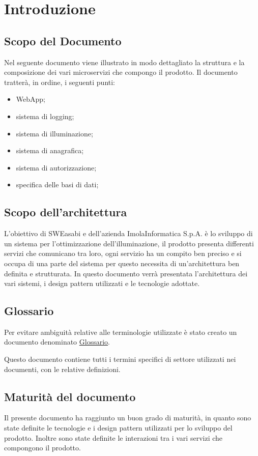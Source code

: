 \chapter{Introduzione}

\section{Scopo del Documento}
Nel seguente documento viene illustrato in modo dettagliato la struttura e la composizione dei vari microservizi che compongo il prodotto. Il documento tratterà, in ordine, i seguenti punti:
\begin{itemize}
    \item WebApp;
    \item sistema di logging;
    \item sistema di illuminazione;
    \item sistema di anagrafica;
    \item sistema di autorizzazione;
    \item specifica delle basi di dati;
\end{itemize}

\section{Scopo dell'architettura}
L'obiettivo di SWEasabi e dell'azienda ImolaInformatica S.p.A. è lo sviluppo di un sistema per l'ottimizzazione dell'illuminazione, il prodotto presenta differenti servizi che comunicano tra loro, ogni servizio ha un compito ben preciso e si occupa di una parte del sistema per questo necessita di un'architettura ben definita e strutturata.
In questo documento verrà presentata l'architettura dei vari sistemi, i design pattern utilizzati e le tecnologie adottate.


\section{Glossario}
Per evitare ambiguità relative alle terminologie utilizzate è stato creato un documento denominato \href{https://github.com/SWEasabi/glossario/releases}{Glossario}.

Questo documento contiene tutti i termini specifici di settore utilizzati nei documenti, con le relative definizioni.

\section{Maturità del documento}
Il presente documento ha raggiunto un buon grado di maturità, in quanto sono state definite le tecnologie e i design pattern utilizzati per lo sviluppo del prodotto. Inoltre sono state definite le interazioni tra i vari servizi che compongono il prodotto.

